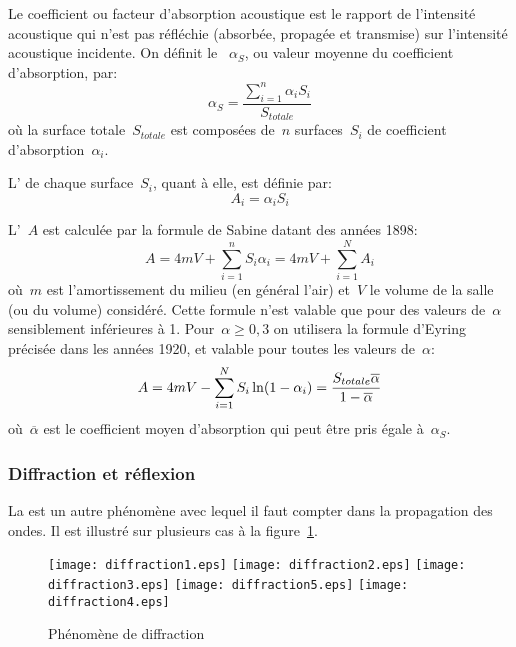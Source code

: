 \medskip
Le coefficient ou facteur d'absorption acoustique est le rapport de l'intensité acoustique qui n'est pas réfléchie (absorbée, propagée et transmise) sur l'intensité acoustique incidente.
On définit le ~$\alpha_S$, ou valeur moyenne du coefficient d'absorption, par:
\begin{equation}
\alpha_S = \dfrac{\sum_{i=1}^n\alpha_iS_i}{S_{totale}}
\end{equation}
où la surface totale~$S_{totale}$ est composées de~$n$ surfaces~$S_i$ de coefficient d'absorption~$\alpha_i$.

L' de chaque surface~$S_i$, quant à elle, est définie par:
\begin{equation}
A_i=\alpha_iS_i
\end{equation}

\medskip
L'~$A$ est calculée par la formule de Sabine datant des années 1898:
\begin{equation}\label{Eq-ASabine}
A = 4mV + \sum^n_{i=1} S_i \alpha_i = 4mV + \sum^{N}_{i=1} A_i
\end{equation}
où~$m$ est l'amortissement du milieu (en général l'air) et~$V$ le volume de la salle (ou du volume) considéré.
Cette formule n'est valable que pour des valeurs de~$\alpha$ sensiblement inférieures à 1. Pour~$\alpha\ge0,3$ on utilisera la formule d'Eyring précisée dans les années 1920, et valable pour toutes les valeurs de~$\alpha$:
\begin{equation}\label{Eq-AEyring}
A = 4mV - \displaystyle\sum_{i=1}^N S_i \ln(1-\alpha_i)=\dfrac{S_{totale}\overline{\alpha}}{1-\overline{\alpha}}
\end{equation}
où~$\overline{\alpha}$ est le coefficient moyen d'absorption qui peut être pris égale à~$\alpha_S$.





\medskip
\subsubsection{Diffraction et réflexion}

La  est un autre phénomène avec lequel il faut compter dans la propagation des ondes. Il est illustré sur plusieurs cas à la figure~\ref{Fig-diffrac}.
\begin{figure}[h!]
\centering
\texttt{[image: diffraction1.eps]}\hfill%
\texttt{[image: diffraction2.eps]}\hfill%
\texttt{[image: diffraction3.eps]}\hfill%
\texttt{[image: diffraction5.eps]}\hfill%
\texttt{[image: diffraction4.eps]}
\caption{Phénomène de diffraction}\label{Fig-diffrac}
\end{figure}

